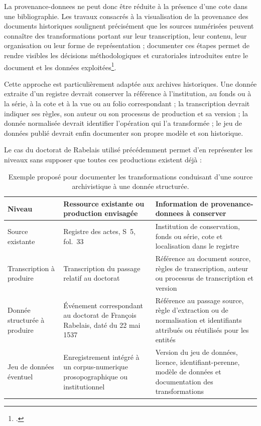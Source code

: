 La \gls{provenance-donnees} ne peut donc être réduite à la présence d'une cote dans une bibliographie. Les travaux consacrés à la visualisation de la provenance des documents historiques soulignent précisément que les sources numérisées peuvent connaître des transformations portant sur leur transcription, leur contenu, leur organisation ou leur forme de représentation ; documenter ces étapes permet de rendre visibles les décisions méthodologiques et curatoriales introduites entre le document et les données exploitées\footcite{VancisinEtAl2023Provenance}.

Cette approche est particulièrement adaptée aux archives historiques. Une donnée extraite d'un registre devrait conserver la référence à l'institution, au fonds ou à la série, à la cote et à la vue ou au folio correspondant ; la transcription devrait indiquer ses règles, son auteur ou son processus de production et sa version ; la donnée normalisée devrait identifier l'opération qui l'a transformée ; le jeu de données publié devrait enfin documenter son propre modèle et son historique.

Le cas du doctorat de Rabelais utilisé précédemment permet d'en représenter les niveaux sans supposer que toutes ces productions existent déjà :

\begin{table}[htbp]
	\centering
	\small
	\begin{tabular}{p{} p{} p{}}
		\toprule
		\textbf{Niveau} &
		\textbf{Ressource existante ou production envisagée} &
		\textbf{Information de \gls{provenance-donnees} à conserver} \\
		\midrule
		
		Source existante
		& Registre des actes, S~5, fol.~33
		& Institution de conservation, fonds ou série, cote et localisation dans le registre \\
		
		Transcription à produire
		& Transcription du passage relatif au doctorat
		& Référence au document source, règles de transcription, auteur ou processus de transcription et version \\
		
		Donnée structurée à produire
		& Événement correspondant au doctorat de François Rabelais, daté du 22 mai 1537
		& Référence au passage source, règle d'extraction ou de normalisation et identifiants attribués ou réutilisés pour les entités \\
		
		Jeu de données éventuel
		& Enregistrement intégré à un \gls{corpus-numerique} prosopographique ou institutionnel
		& Version du jeu de données, licence, \gls{identifiant-perenne}, modèle de données et documentation des transformations \\
		
		\bottomrule
	\end{tabular}
	
	\caption[Exemple de chaîne de provenance d'une donnée historique]
	{Exemple proposé pour documenter les transformations conduisant d'une source archivistique à une donnée structurée.}
	\label{tab:provenance-rabelais}
\end{table}

